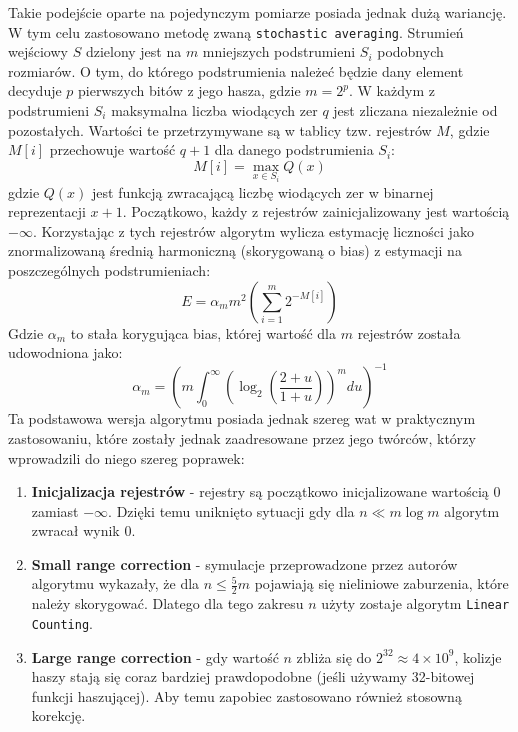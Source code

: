 Takie podejście oparte na pojedynczym pomiarze posiada jednak dużą wariancję. W tym celu zastosowano metodę zwaną \texttt{stochastic averaging}. Strumień wejściowy $S$ dzielony jest na $m$ mniejszych podstrumieni $S_i$ podobnych rozmiarów. O tym, do którego podstrumienia należeć będzie dany element decyduje $p$ pierwszych bitów z jego hasza, gdzie $m = 2^p$. W każdym z podstrumieni $S_i$ maksymalna liczba wiodących zer $q$ jest zliczana niezależnie od pozostałych. Wartości te przetrzymywane są w tablicy tzw. rejestrów $M$, gdzie $M[i]$ przechowuje wartość $q + 1$ dla danego podstrumienia $S_i$:
\begin{equation}
    M[i] = \max_{x \in S_i} Q(x)
\end{equation}
gdzie $Q(x)$ jest funkcją zwracającą liczbę wiodących zer w binarnej reprezentacji $x + 1$. Początkowo, każdy z rejestrów zainicjalizowany jest wartością $-\infty$. Korzystając z tych rejestrów algorytm wylicza estymację liczności jako znormalizowaną średnią harmoniczną (skorygowaną o bias) z estymacji na poszczególnych podstrumieniach:
\begin{equation}
    E = {\alpha}_m{m}^{2}(\sum_{i=1}^{m} 2^{-M[i]})
\end{equation}
Gdzie ${\alpha}_{m}$ to stała korygująca bias, której wartość dla $m$ rejestrów została udowodniona \cite{hll} jako:
\begin{equation}
    {\alpha}_{m} = (m \int_{0}^{\infty} ({\log}_2(\frac{2 + u}{1 + u}))^m du)^{-1}
\end{equation}
Ta podstawowa wersja algorytmu posiada jednak szereg wat w praktycznym zastosowaniu, które zostały jednak zaadresowane przez jego twórców, którzy wprowadzili do niego szereg poprawek:
\begin{enumerate}
    \item \textbf{Inicjalizacja rejestrów} - rejestry są początkowo inicjalizowane wartością $0$ zamiast $-\infty$. Dzięki temu uniknięto sytuacji gdy dla $n \ll m\log{m}$ algorytm zwracał wynik $0$.
    \item \textbf{Small range correction} - symulacje przeprowadzone przez autorów algorytmu wykazały, że dla $n \le \frac{5}{2}m$ pojawiają się nieliniowe zaburzenia, które należy skorygować. Dlatego dla tego zakresu $n$ użyty zostaje algorytm \texttt{Linear Counting}.
    \item \textbf{Large range correction} - gdy wartość $n$ zbliża się do $2^32 \approx 4 \times 10^9$, kolizje haszy stają się coraz bardziej prawdopodobne (jeśli używamy 32-bitowej funkcji haszującej). Aby temu zapobiec zastosowano również stosowną korekcję.
\end{enumerate}

